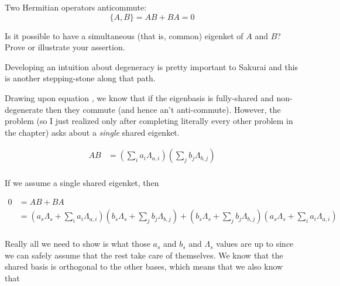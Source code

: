 \begin{question}

  Two Hermitian operators anticommute:
  \begin{equation*}
    \{A, B\} = AB + BA = 0
  \end{equation*}

  Is it possible to have a simultaneous (that is, common) eigenket of
  $A$ and $B$? Prove or illustrate your assertion.

\end{question}

\begin{purpose}
  Developing an intuition about degeneracy is pretty important to
  Sakurai and this is another stepping-stone along that path.
\end{purpose}

\begin{answer}

  Drawing upon equation , we know that if the
  eigenbasis is fully-shared and non-degenerate then they commute (and
  hence an't anti-commute).  However, the problem (so I just realized
  only after completing literally every other problem in the chapter)
  asks about a \emph{single} shared eigenket.

  \begin{equation}
    \begin{split}
      AB
      &=
      \left(\sum_{i} a_i\Lambda_{a,i}\right)
      \left(\sum_{j} b_j\Lambda_{b,j}\right)\\
    \end{split}
  \end{equation}

  If we assume a single shared eigenket, then

  \begin{equation}
    \begin{split}
      0
      &= AB + BA\\
      &=
      \left(a_s\Lambda_s + \sum_{i} a_i\Lambda_{a,i}\right)
      \left(b_s\Lambda_s + \sum_{j} b_j\Lambda_{b,j}\right)
      +
      \left(b_s\Lambda_s + \sum_{j} b_j\Lambda_{b,j}\right)
      \left(a_s\Lambda_s + \sum_{i} a_i\Lambda_{a,i}\right)
      \\
    \end{split}
  \end{equation}

  Really all we need to show is what those $a_s$ and $b_s$ and
  $\Lambda_s$ values are up to since we can safely assume that the
  rest take care of themselves.  We know that the shared basis is
  orthogonal to the other bases, which means that we also know that


\end{answer}
